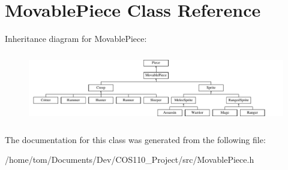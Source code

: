 \hypertarget{classMovablePiece}{\section{Movable\-Piece Class Reference}
\label{classMovablePiece}
}
Inheritance diagram for Movable\-Piece\-:\begin{figure}[H]
\begin{center}
\leavevmode
\includegraphics[height=3.080308cm]{classMovablePiece}
\end{center}
\end{figure}


The documentation for this class was generated from the following file\-:\begin{DoxyCompactItemize}
\item 
/home/tom/\-Documents/\-Dev/\-C\-O\-S110\-\_\-\-Project/src/Movable\-Piece.\-h\end{DoxyCompactItemize}
